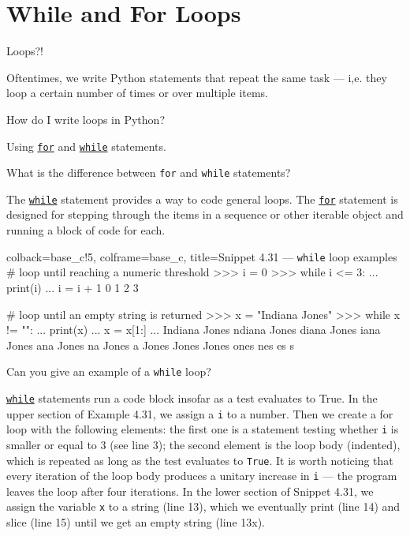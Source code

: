 \documentclass[a4paper,11pt]{book}
\newcommand{\question}[1]{%
    \begin{tcolorbox}[colback=comp_c!10,colframe=comp_c,sidebyside align=top,width=\linewidth,before skip=1ex]
        #1
    \end{tcolorbox}
    \switchcolumn%
}
\newcommand{\note}[1]{%
    \begin{tcolorbox}[colback=white!0,colframe=white!10,width=\linewidth,before skip=1ex]
        #1
    \end{tcolorbox}
}
\begin{document}
\section{While and For Loops}
\label{sec:while_and_for_loops}

\begin{paracol}{2}
	\question{\raggedright Loops?!}
	\note{Oftentimes, we write Python statements that repeat the same task --- i,e. they loop a certain number of times or over multiple items.}
\end{paracol}

\begin{paracol}{2}
	\question{\raggedright How do I write loops in Python?}
	\note{Using \href{https://docs.python.org/3/reference/compound_stmts.html\#for}{\texttt{for}} and \href{https://docs.python.org/3/reference/compound_stmts.html\#while}{\texttt{while}} statements.}
\end{paracol}

\begin{paracol}{2}
	\question{\raggedright What is the difference between \texttt{for} and \texttt{while} statements?}
	\note{The \href{https://docs.python.org/3/reference/compound_stmts.html\#while}{\texttt{while}} statement provides a way to code general loops. The \href{https://docs.python.org/3/reference/compound_stmts.html\#for}{\texttt{for}} statement is designed for stepping through the items in a sequence or other iterable object and running a block of code for each.}
\end{paracol}

\begin{pythoncode}[linenos=true,]{colback=base_c!5, colframe=base_c, title=\sffamily Snippet 4.31 --- \texttt{while} loop examples}
# loop until reaching a numeric threshold
>>> i = 0
>>> while i <= 3:
...     print(i)
...     i = i + 1
0
1
2
3

# loop until an empty string is returned
>>> x = "Indiana Jones"
>>> while x != "":
...     print(x)
...     x = x[1:]
... 
Indiana Jones
ndiana Jones
diana Jones
iana Jones
ana Jones
na Jones
a Jones
 Jones
Jones
ones
nes
es
s
\end{pythoncode}
\clearpage

\begin{paracol}{2}
	\question{\raggedright Can you give an example of a \texttt{while} loop?}
	\note{\href{https://docs.python.org/3/reference/compound_stmts.html\#while}{\texttt{while}} statements run a code block insofar as a test evaluates to True. In the upper section of Example 4.31, we assign a \texttt{i} to a number. Then we create a for loop with the following elements: the first one is a statement testing whether \texttt{i} is smaller or equal to 3 (see line 3); the second element is the loop body (indented), which is repeated as long as the test evaluates to \texttt{True}. It is worth noticing that every iteration of the loop body produces a unitary increase in \texttt{i} --- the program leaves the loop after four iterations. In the lower section of Snippet 4.31, we assign the variable \texttt{x} to a string (line 13), which we eventually print (line 14) and slice (line 15) until we get an empty string (line 13x).}
\end{paracol}
\end{document}
